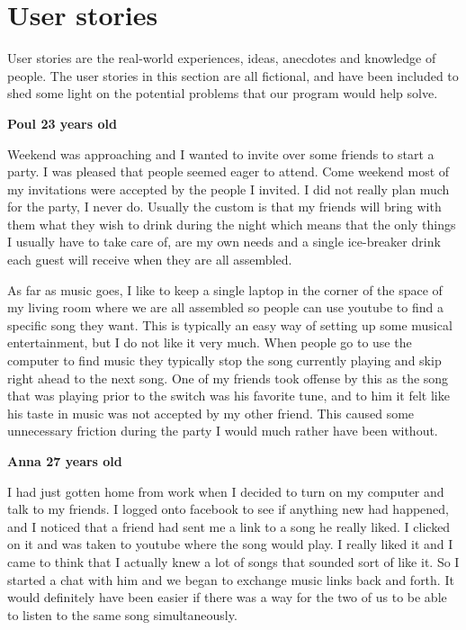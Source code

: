 \section{User stories}

User stories are the real-world experiences, ideas, anecdotes and knowledge of people\cite{Benyon10}. The user stories in this section are all fictional, and have been included to shed some light on the potential problems that our program would help solve.

\noindent
\textbf{Poul 23 years old}

\vspace{5 mm}
\noindent
Weekend was approaching and I wanted to invite over some friends to start a party. I was pleased that people seemed eager to attend. Come weekend most of my invitations were accepted by the people I invited. I did not really plan much for the party, I never do. Usually the custom is that my friends will bring with them what they wish to drink during the night which means that the only things I usually have to take care of, are my own needs and a single ice-breaker drink each guest will receive when they are all assembled.  

As far as music goes, I like to keep a single laptop in the corner of the space of my living room where we are all assembled so people can use youtube to find a specific song they want. This is typically an easy way of setting up some musical entertainment, but I do not like it very much. When people go to use the computer to find music they typically stop the song currently playing and skip right ahead to the next song. One of my friends took offense by this as the song that was playing prior to the switch was his favorite tune, and to him it felt like his taste in music was not accepted by my other friend. This caused some unnecessary friction during the party I would much rather have been without.

\vspace{5 mm}
\noindent
\textbf{Anna 27 years old}

\vspace{5 mm}
\noindent
I had just gotten home from work when I decided to turn on my computer and talk to my friends. I logged onto facebook to see if anything new had happened, and I noticed that a friend had sent me a link to a song he really liked. I clicked on it and was taken to youtube where the song would play. I really liked it and I came to think that I actually knew a lot of songs that sounded sort of like it. So I started a chat with him and we began to exchange music links back and forth. It would definitely have been easier if there was a way for the two of us to be able to listen to the same song simultaneously. 

